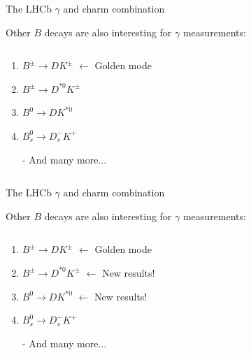 \documentclass[dvipsnames]{beamer}
\begin{document}
\begin{frame}{The LHCb $\gamma$ and charm combination}
  \begin{center}
    \Large Other $B$ decays are also interesting for $\gamma$ measurements:
  \end{center}
  \vspace{0.2cm}
  \begin{columns}
    \begin{column}{0.6\textwidth}
      \vspace{1.5cm}
      \begin{enumerate}
        \item{$B^\pm\to DK^\pm$ $\leftarrow$ Golden mode}
        \item{$B^\pm\to D^{*0}K^\pm$}
        \item{$B^0\to DK^{*0}$}
        \item{$B_s^0\to D_s^-K^+$}
        \item[-]{And many more...}
      \end{enumerate}
      \vspace{1.5cm}
    \end{column}
    \begin{column}{0.4\textwidth}
    \end{column}
  \end{columns}
\end{frame}

\begin{frame}{The LHCb $\gamma$ and charm combination}
  \begin{center}
    \Large Other $B$ decays are also interesting for $\gamma$ measurements:
  \end{center}
  \vspace{0.2cm}
  \begin{columns}
    \begin{column}{0.6\textwidth}
      \vspace{1.5cm}
      \begin{enumerate}
        \item{$B^\pm\to DK^\pm$ $\leftarrow$ Golden mode}
        \item{$B^\pm\to D^{*0}K^\pm$ $\leftarrow$ New results!}
        \item{$B^0\to DK^{*0}$ $\leftarrow$ New results!}
        \item{$B_s^0\to D_s^-K^+$}
        \item[-]{And many more...}
      \end{enumerate}
      \vspace{1.5cm}
    \end{column}
    \begin{column}{0.4\textwidth}
    \end{column}
  \end{columns}
\end{frame}
\end{document}
